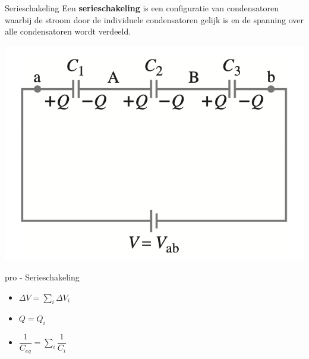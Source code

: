 \begin{theo}[Serieschakeling]{Serieschakeling}
    Een \textbf{serieschakeling} is een configuratie van condensatoren waarbij de stroom door de individuele condensatoren gelijk is en de spanning over alle condensatoren wordt verdeeld. 
    \begin{center}
        \includegraphics[scale = 0.35]{Images/Elektriciteit/Serieschakeling.png}
    \end{center}
\end{theo}

\begin{pro}{pro - Serieschakeling}
    \begin{itemize}
        \item $\Delta V = \sum_i \Delta V_i$
        \item $Q = Q_i$
        \item $\dfrac{1}{C_{eq}} = \sum_i\dfrac{1}{C_i}$
    \end{itemize}
\end{pro}

\newpage


